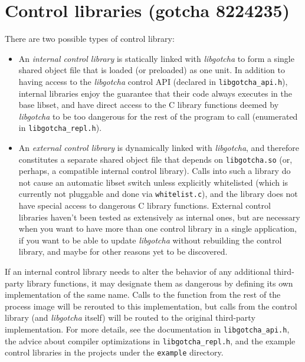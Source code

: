 \documentclass[12pt,letterpaper,openright]{report}
\begin{document}
\section{Control libraries (gotcha 8224235)}

There are two possible types of control library:
\begin{itemize}
\item An \textit{internal control library} is statically linked with \textit{libgotcha} to form a single shared
   object file that is loaded (or preloaded) as one unit.  In addition to having access to the
   \textit{libgotcha} control API (declared in \texttt{libgotcha\_api.h}), internal libraries enjoy the guarantee
   that their code always executes in the base libset, and have direct access to the C library
   functions deemed by \textit{libgotcha} to be too dangerous for the rest of the program to call
   (enumerated in \texttt{libgotcha\_repl.h}).
\item An \textit{external control library} is dynamically linked with \textit{libgotcha}, and therefore constitutes
   a separate shared object file that depends on \texttt{libgotcha.so} (or, perhaps, a compatible internal
   control library).  Calls into such a library do not cause an automatic libset switch unless
   explicitly whitelisted (which is currently not pluggable and done via \texttt{whitelist.c}), and the
   library does not have special access to dangerous C library functions.  External control
   libraries haven't been tested as extensively as internal ones, but are necessary when you want to
   have more than one control library in a single application, if you want to be able to update
   \textit{libgotcha} without rebuilding the control library, and maybe for other reasons yet to be
   discovered.
\end{itemize}

If an internal control library needs to alter the behavior of any additional third-party library
functions, it may designate them as dangerous by defining its own implementation of the same name.
Calls to the function from the rest of the process image will be rerouted to this implementation,
but calls from the control library (and \textit{libgotcha} itself) will be routed to the original
third-party implementation.  For more details, see the documentation in \texttt{libgotcha\_api.h}, the
advice about compiler optimizations in \texttt{libgotcha\_repl.h}, and the example control libraries in the
projects under the \texttt{example} directory.
\end{document}
